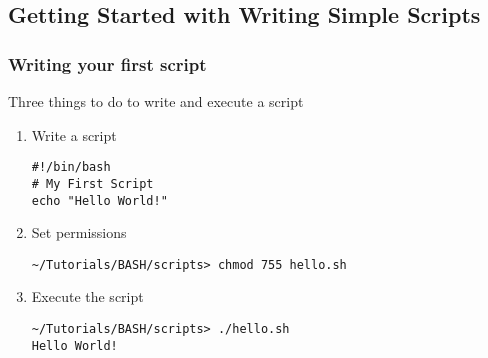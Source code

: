 \documentclass[slidestop,mathserif,compress,xcolor=svgnames]{beamer}
\newenvironment{bblock}[0]
{
\begin{beamerboxesrounded}[upper=uppercol1,lower=lowercol1,shadow=true]}
{\end{beamerboxesrounded}}
\begin{document}
\subsection{Getting Started with Writing Simple Scripts}
\begin{frame}[fragile]
  \frametitle{\small Writing your first script}
  \begin{bblock}{Three things to do to write and execute a script}
    {\scriptsize
    \begin{enumerate}
      \item Write a script
      {\tiny
      \begin{verbatim}
#!/bin/bash
# My First Script
echo "Hello World!"
      \end{verbatim}
      }
      \item Set permissions
      {\tiny
      \begin{verbatim}
~/Tutorials/BASH/scripts> chmod 755 hello.sh 
      \end{verbatim}
      }
      \item Execute the script
      {\tiny
      \begin{verbatim}
~/Tutorials/BASH/scripts> ./hello.sh 
Hello World!
      \end{verbatim}
      }
    \end{enumerate}
    }
  \end{bblock}
\end{frame}
\end{document}
